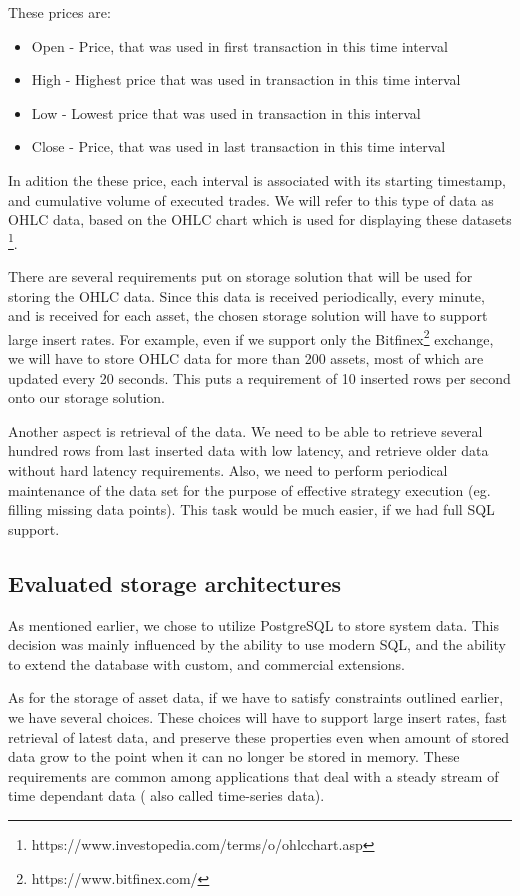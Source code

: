 These prices are:
\begin{itemize}
    \item{Open - } Price, that was used in first transaction in this time interval
    \item{High - } Highest price that was used in transaction in this time interval
    \item{Low - }  Lowest price that was used in transaction in this interval
    \item{Close -} Price, that was used in last transaction in this time interval
\end{itemize}

In adition the these price, each interval is associated with its starting timestamp, and cumulative volume
of executed trades. We will refer to this type of data as OHLC data, based on the OHLC chart which is used for displaying
these datasets \footnote{https://www.investopedia.com/terms/o/ohlcchart.asp}.

There are several requirements put on storage solution that will be used for storing the OHLC data. Since this data is received periodically,
every minute, and is received for each asset, the chosen storage solution will have to support large insert rates. For example,
even if we support only the Bitfinex\footnote{https://www.bitfinex.com/} exchange, we will have to store OHLC data for more than 200 assets,
most of which are updated every 20 seconds. This puts a requirement of 10 inserted rows per second onto our storage solution.

Another aspect is retrieval of the data. We need to be able to retrieve several hundred rows from last inserted data with
low latency, and retrieve older data without hard latency requirements. Also, we need to perform periodical maintenance
of the data set for the purpose of effective strategy execution (eg. filling missing data points). This task would be
much easier, if we had full SQL support.


\subsection{Evaluated storage architectures}
As mentioned earlier, we chose to utilize PostgreSQL to store system data. This decision was mainly influenced by the
ability to use modern SQL, and the ability to extend the database with custom, and commercial extensions.

As for the storage of asset data, if we have to satisfy constraints outlined earlier, we have several choices. These
choices will have to support large insert rates, fast retrieval of latest data, and preserve these properties even
when amount of stored data grow to the point when it can no longer be stored in memory. These requirements are common
among applications that deal with a steady stream of time dependant data ( also called time-series data).

